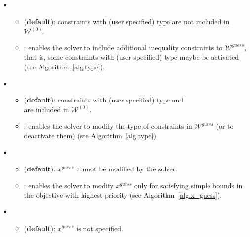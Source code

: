 \documentclass[12pt,a4paper]{article}
\begin{document}
\begin{itemize}

\item {}

  \begin{itemize}
  \item[\ding{237}]  ({\bf default}): constraints with (user specified) type  are not included in $\mathcal{W}^{(0)}$.
  \item[\ding{237}] : enables the solver to include additional inequality constraints to
    $\mathcal{W}^{\mathit{guess}}$, that is, some constraints with (user specified) type
     maybe be activated (see Algorithm~\ref{alg.type}).
  \end{itemize}

\item {}

  \begin{itemize}
  \item[\ding{237}]  ({\bf default}): constraints with (user specified) type  and \\  are included in $\mathcal{W}^{(0)}$.
  \item[\ding{237}] : enables the solver to modify the type of constraints in $\mathcal{W}^{\mathit{guess}}$ (or to deactivate them) (see Algorithm~\ref{alg.type}).
  \end{itemize}

\item {}

  \begin{itemize}
  \item[\ding{237}]  ({\bf default}): $x^{\mathit{guess}}$ cannot be modified by the solver.
  \item[\ding{237}] : enables the solver to modify $x^{\mathit{guess}}$ only for satisfying simple
    bounds in the objective with highest priority (see Algorithm~\ref{alg.x_guess}).
  \end{itemize}

\item {}

  \begin{itemize}
  \item[\ding{237}]  ({\bf default}): $x^{\mathit{guess}}$ is not specified.


\end{itemize}
\end{itemize}
\end{document}

